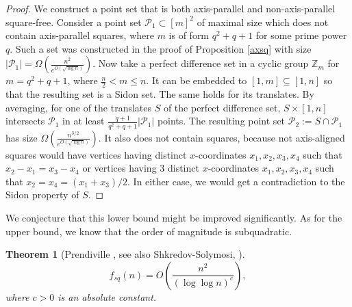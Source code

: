 \documentclass[11pt]{article}
\theoremstyle{plain}
\newtheorem{theorem}{\bf Theorem}[section]
\newcommand\cP{{\mathcal P}}
\newcommand{\Z}{\mathbb{Z}}
\begin{document}
	
	\begin{proof}
		We construct a point set that is both axis-parallel and non-axis-parallel square-free. Consider a point set $\cP_1\subset [m]^2$ of maximal size which does not contain axis-parallel squares, where $m$ is of form $q^2+q+1$ for some prime power $q$. Such a set was constructed in the proof of Proposition \ref{axsq} with size $|\cP_1|=\Omega\left(\frac{n^2}{e^{O(\sqrt{\log{n}})}}\right).$ Now take a
		perfect difference set in a cyclic group $\Z_m$ for $m=q^2+q+1$, where $\frac{n}{2}<m\le n$. It can be embedded to $[1,m]\subseteq [1,n]$ so that the resulting set is a Sidon set. The same holds for its translates. By averaging, for one of the translates $S$ of the perfect difference set, $S\times [1,n]$  intersects $\cP_1$ in at least $\frac{q+1}{q^2+q+1}|\cP_1|$ points. The resulting point set $\cP_2:=S\cap \cP_1$ has size $\Omega\left(\frac{n^{3/2}}{e^{O(\sqrt{\log{n}})}}\right)$. It also does not contain squares, because not axis-aligned squares would have vertices having distinct $x$-coordinates $x_1, x_2, x_3, x_4$ such that  $x_2-x_1=x_3-x_4$ or vertices having 3 distinct $x$-coordinates $x_1, x_2, x_3, x_4$ such that  $x_2=x_4=(x_1+x_3)/2$. In either case,  we would get a contradiction to the Sidon property of $S$.
	\end{proof}
	
	
	
	We conjecture that this lower bound might be improved significantly. As for the upper bound, we know that the order of magnitude is subquadratic.
	
	\begin{theorem}[Prendiville \cite{Pren}, see also Shkredov-Solymosi, \cite{SS}]\label{sq_up}
		$$f_{sq}(n)=O\left(\frac{n^{2}}{(\log\log{n})^c}\right),$$ where $c>0$ is an absolute constant.
	\end{theorem}
	
	
	
	
	
\end{document}
